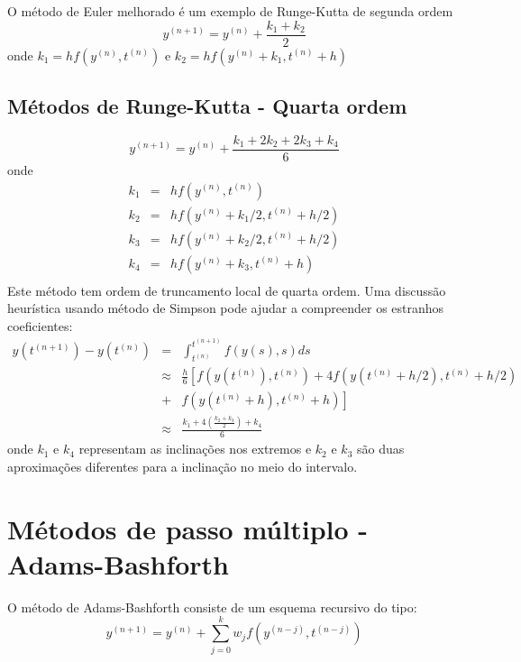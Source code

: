 \begin{ex} O método de Euler melhorado é um exemplo de Runge-Kutta de segunda ordem
$$y^{(n+1)}=y^{(n)}+\frac{k_1+k_2}{2}$$
onde $k_1=hf(y^{(n)},t^{(n)})$ e $k_2=hf(y^{(n)}+k_1,t^{(n)}+h)$
\end{ex}

\subsection{Métodos de Runge-Kutta - Quarta ordem}

$$y^{(n+1)}=y^{(n)}+\frac{k_1+2k_2+2k_3+k_4}{6}$$
onde
\begin{eqnarray*}
k_1&=&hf(y^{(n)},t^{(n)})\\
k_2&=&hf(y^{(n)}+k_1/2,t^{(n)}+h/2)\\
k_3&=&hf(y^{(n)}+k_2/2,t^{(n)}+h/2)\\
k_4&=&hf(y^{(n)}+k_3,t^{(n)}+h)\\
\end{eqnarray*}
Este método tem ordem de truncamento local de quarta ordem. Uma discussão heurística usando método de Simpson pode ajudar a compreender os estranhos coeficientes:
\begin{eqnarray*}
y({t^{(n+1)}})-y({t^{(n)}})&=&\int_{t^{(n)}}^{t^{(n+1)}}f(y(s),s)ds \\
&\approx& \frac{h}{6}\left[ f\left(y(t^{(n)}),t^{(n)}\right)+4f\left(y(t^{(n)}+h/2),t^{(n)}+h/2\right)\right.\\
&+&\left.f\left(y(t^{(n)}+h),t^{(n)}+h\right)\right]\\
&\approx& \frac{k_1+4(\frac{k_2+k_3}{2})+k_4}{6}
\end{eqnarray*}
onde $k_1$ e $k_4$ representam as inclinações nos extremos e $k_2$ e $k_3$ são duas aproximações diferentes para a inclinação no meio do intervalo.


\section{Métodos de passo múltiplo - Adams-Bashforth}

O método de Adams-Bashforth consiste de um esquema recursivo do tipo:
$$y^{(n+1)}=y^{(n)}+\sum_{j=0}^k w_jf(y^{(n-j)},t^{(n-j)})$$

